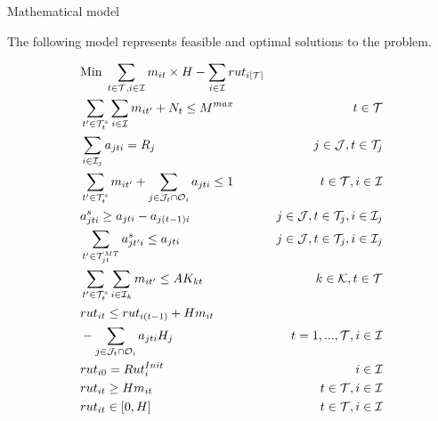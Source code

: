 \documentclass[final]{beamer}
\newlength{\twocolwid}
\begin{document}
\begin{frame}[t]
\begin{columns}[t]
\begin{column}{\twocolwid}
	\begin{columns}[t,totalwidth=\twocolwid] %

		\begin{column}{\twocolwid}\vspace{-.6in} %

			\begin{block}{Mathematical model}

				The following model represents feasible and optimal solutions to the problem.

			    \begin{align*}
			    	& \text{Min}\; \sum_{t \in \mathcal{T}, i \in \mathcal{I}} m_{it} \times H - \sum_{i \in \mathcal{I}} rut_{i|\mathcal{T}|} \\
			        & \sum_{t' \in \mathcal{T}^{s}_t} \sum_{i \in \mathcal{I}} m_{it'} + N_t \leq M^{max}
			          & t \in \mathcal{T} \\
			        & \sum_{i \in \mathcal{I}_j} a_{jti} = R_j
			                & j \in \mathcal{J}, t \in \mathcal{T}_j  \\
			        & \sum_{t' \in \mathcal{T}^{s}_t} m_{it'} + \sum_{j \in \mathcal{J}_t \cap \mathcal{O}_i} a_{jti} \leq 1 
			                & t \in \mathcal{T}, i \in \mathcal{I}\\
			        & a^s_{jti} \geq a_{jti} - a_{j(t-1)i}
			                & j \in \mathcal{J}, t \in \mathcal{T}_j, i \in \mathcal{I}_j \\
			        & \sum_{t' \in \mathcal{T}^{MT}_{jt}} a^s_{jt'i} \leq a_{jti} 
			        & j \in \mathcal{J}, t \in \mathcal{T}_j, i \in \mathcal{I}_j \label{eq:start3}\\
			       & \sum_{t' \in \mathcal{T}^{s}_t} \sum_{i \in \mathcal{I}_k} m_{it'} \leq AK_{kt}
			        &k \in \mathcal{K}, t \in \mathcal{T} \\
			         & rut_{it} \leq rut_{i(t-1)} + H m_{it} \notag \\ 
			         	& - \sum_{j \in \mathcal{J}_t \cap \mathcal{O}_i} a_{jti} H_j 
			         	& t =1, ..., \mathcal{T}, i \in \mathcal{I} \\
			        & rut_{i0} = Rut^{Init}_i
			               & i \in \mathcal{I} \\
			        & rut_{it} \geq H m_{it}
			                & t \in \mathcal{T}, i \in \mathcal{I}\\ 
			        & rut_{it} \in [0,H]
			                & t \in \mathcal{T}, i \in \mathcal{I} \\

\end{align*}
\end{block}
\end{column}
\end{columns}
\end{column}
\end{columns}
\end{frame}
\end{document}

